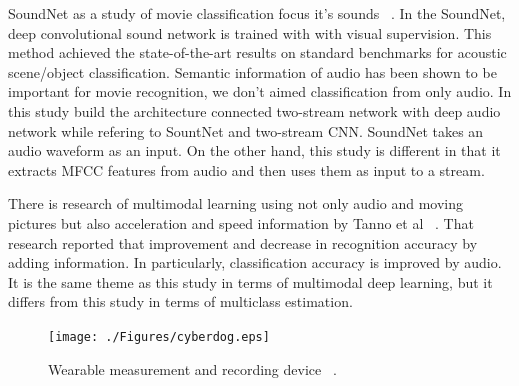 \documentclass[MIRU,submit,english]{miru2019e}
\begin{document}
SoundNet as a study of movie classification focus it's sounds ~\cite{aytar2016soundnet}.
In the SoundNet, deep convolutional sound network is trained with with visual supervision.
This method achieved the state-of-the-art results on standard benchmarks for acoustic scene/object classification. 
Semantic information of audio has been shown to be important for movie recognition, we don't aimed classification from only audio. 
In this study build the architecture connected two-stream network with deep audio network while refering to SountNet and two-stream CNN.
SoundNet takes an audio waveform as an input. 
On the other hand, this study is different in that it extracts MFCC features from audio and then uses them as input to a stream.

There is research of multimodal learning using not only audio and moving pictures but also acceleration and speed information by Tanno et al ~\cite{tannno2019deim}.
That research reported that improvement and decrease in recognition accuracy by adding information.
In particularly, classification accuracy is improved by audio. 
It is the same theme as this study in terms of multimodal deep learning, but it differs from this study in terms of multiclass estimation.

\begin{figure}[tb]
 \begin{center}
  \texttt{[image: ./Figures/cyberdog.eps]}
  \caption{Wearable measurement and recording device ~\cite{dog01}.}
  \label{cyber}
 \end{center}
\end{figure}
\end{document}

